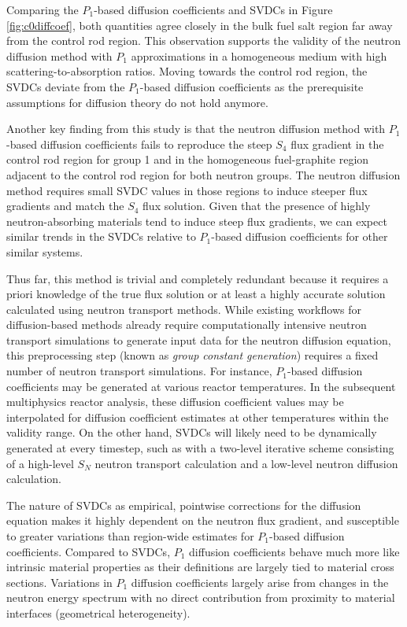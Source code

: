 Comparing the $P_1$-based diffusion coefficients and \glspl{SVDC} in Figure \ref{fig:c0diffcoef},
both quantities agree closely in the bulk fuel salt region far away from the control rod region.
This observation supports the validity of the neutron diffusion method with $P_1$ approximations
in a homogeneous medium with high scattering-to-absorption ratios. Moving towards the control rod
region, the \glspl{SVDC} deviate from the $P_1$-based diffusion coefficients as the prerequisite
assumptions for diffusion theory do not hold anymore.

Another key finding from this study is that the neutron diffusion method with $P_1$-based
diffusion coefficients fails to reproduce the steep $S_4$ flux gradient in the control rod region
for group 1 and in the homogeneous fuel-graphite region adjacent to the control rod region for both
neutron groups. The neutron diffusion method requires small \gls{SVDC} values in those regions to
induce steeper flux gradients and match the $S_4$ flux solution. Given that the presence of highly
neutron-absorbing materials tend to induce steep flux gradients, we can expect similar trends in
the \glspl{SVDC} relative to $P_1$-based diffusion coefficients for other similar systems.

Thus far, this method is trivial and completely redundant because it requires a priori
knowledge of the true flux solution or at least a highly accurate solution calculated using neutron
transport methods. While existing workflows for diffusion-based methods already require
computationally intensive neutron transport simulations to generate input data for the neutron
diffusion equation, this preprocessing step (known as \textit{group constant generation}) requires
a fixed number of neutron transport simulations. For instance, $P_1$-based diffusion coefficients
may be generated at various reactor temperatures. In the subsequent multiphysics reactor analysis,
these diffusion coefficient values may be interpolated for diffusion coefficient estimates at other
temperatures within the validity range. On the other hand, \glspl{SVDC} will likely need to be
dynamically generated at every timestep, such as with a two-level iterative scheme consisting of a
high-level $S_N$ neutron transport calculation and a low-level neutron diffusion calculation.

The nature of \glspl{SVDC} as empirical, pointwise corrections for
the diffusion equation makes it highly dependent on the neutron flux gradient, and
susceptible to greater variations than region-wide estimates for $P_1$-based diffusion
coefficients. Compared to \glspl{SVDC}, $P_1$ diffusion coefficients behave much more like
intrinsic material properties as their definitions are largely tied to material cross sections.
Variations in $P_1$ diffusion coefficients largely arise from changes in the neutron energy
spectrum with no direct contribution from proximity to material interfaces (geometrical
heterogeneity).

